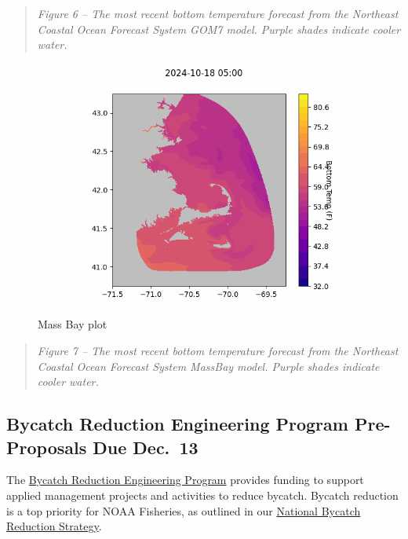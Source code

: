 \documentclass[
]{article}
\begin{document}
\begin{quote}
\emph{Figure 6 -- The most recent bottom temperature forecast from the
Northeast Coastal Ocean Forecast System GOM7 model. Purple shades
indicate cooler water.}
\end{quote}

\begin{figure}
\centering
\includegraphics{NECOFS_MABAY.gif}
\caption{Mass Bay plot}
\end{figure}

\begin{quote}
\emph{Figure 7 -- The most recent bottom temperature forecast from the
Northeast Coastal Ocean Forecast System MassBay model. Purple shades
indicate cooler water.}
\end{quote}

\hypertarget{bycatch-reduction-engineering-program-pre-proposals-due-dec.-13}{%
\subsection{Bycatch Reduction Engineering Program Pre-Proposals Due
Dec.~13}\label{bycatch-reduction-engineering-program-pre-proposals-due-dec.-13}}

The
\href{https://www.fisheries.noaa.gov/national/bycatch/bycatch-reduction-engineering-program}{Bycatch
Reduction Engineering Program} provides funding to support applied
management projects and activities to reduce bycatch. Bycatch reduction
is a top priority for NOAA Fisheries, as outlined in our
\href{https://www.fisheries.noaa.gov/national/bycatch/national-bycatch-reduction-strategy}{National
Bycatch Reduction Strategy}.
\end{document}
